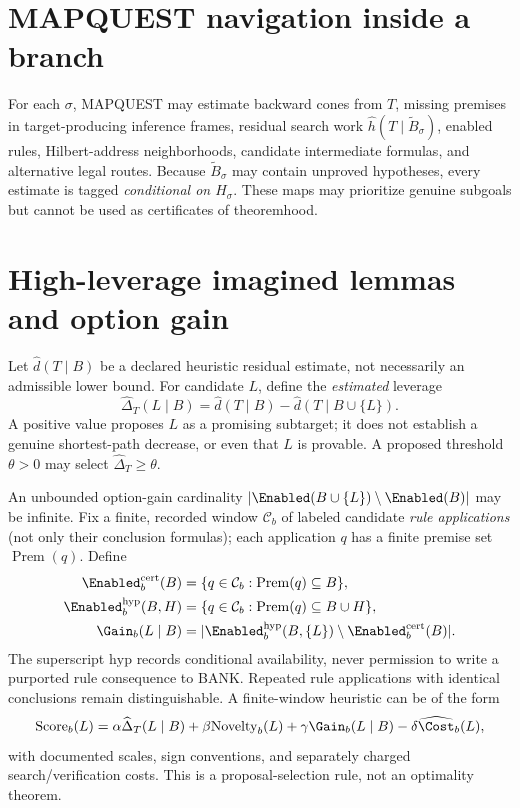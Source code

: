 \section{MAPQUEST navigation inside a branch}
For each $\sigma$, MAPQUEST may estimate backward cones from $T$, missing premises in target-producing inference frames, residual search work $\widehat h(T\mid\widetilde B_\sigma)$, enabled rules, Hilbert-address neighborhoods, candidate intermediate formulas, and alternative legal routes. Because $\widetilde B_\sigma$ may contain unproved hypotheses, every estimate is tagged \emph{conditional on $H_\sigma$}. These maps may prioritize genuine subgoals but cannot be used as certificates of theoremhood.

\section{High-leverage imagined lemmas and option gain}
Let $\widehat d(T\mid B)$ be a declared heuristic residual estimate, not necessarily an admissible lower bound. For candidate $L$, define the \emph{estimated} leverage
\[\widehat\Delta_T(L\mid B)=\widehat d(T\mid B)-\widehat d(T\mid B\cup\{L\}).\]
A positive value proposes $L$ as a promising subtarget; it does not establish a genuine shortest-path decrease, or even that $L$ is provable. A proposed threshold $\theta>0$ may select $\widehat\Delta_T\geq\theta$.

An unbounded option-gain cardinality $|\Enabled(B\cup\{L\})\setminus\Enabled(B)|$ may be infinite. Fix a finite, recorded window $\mathcal C_b$ of labeled candidate \emph{rule applications} (not only their conclusion formulas); each application $q$ has a finite premise set $\operatorname{Prem}(q)$. Define
\[\begin{aligned}
\Enabled_b^{\mathrm{cert}}(B)&=\{q\in\mathcal C_b:\operatorname{Prem}(q)\subseteq B\},\\
\Enabled_b^{\mathrm{hyp}}(B,H)&=\{q\in\mathcal C_b:\operatorname{Prem}(q)\subseteq B\cup H\},\\
\Gain_b(L\mid B)&=|\Enabled_b^{\mathrm{hyp}}(B,\{L\})\setminus\Enabled_b^{\mathrm{cert}}(B)|.
\end{aligned}\]
The superscript $\mathrm{hyp}$ records conditional availability, never permission to write a purported rule consequence to BANK. Repeated rule applications with identical conclusions remain distinguishable. A finite-window heuristic can be of the form
\[\mathrm{Score}_b(L)=\alpha\widehat\Delta_T(L\mid B)+\beta\mathrm{Novelty}_b(L)+\gamma\Gain_b(L\mid B)-\delta\widehat\Cost_b(L),\]
with documented scales, sign conventions, and separately charged search/verification costs. This is a proposal-selection rule, not an optimality theorem.

